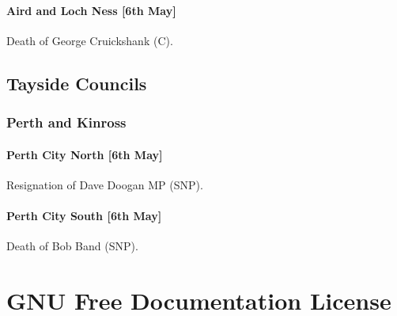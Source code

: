 \documentclass[a4paper,openany]{book}
\begin{document}
\begin{resultsiii}
\subsubsection*{Aird and Loch Ness \hspace*{\fill}\nolinebreak[1]%
	\enspace\hspace*{\fill}
	[6th May]}


Death of George Cruickshank (C).

\section{Tayside Councils}

\subsection*{Perth and Kinross}

\subsubsection*{Perth City North \hspace*{\fill}\nolinebreak[1]%
	\enspace\hspace*{\fill}
	[6th May]}


Resignation of Dave Doogan MP (SNP).

\subsubsection*{Perth City South \hspace*{\fill}\nolinebreak[1]%
	\enspace\hspace*{\fill}
	[6th May]}


Death of Bob Band (SNP).

\end{resultsiii}

\clearpage
{}
{\scriptsize%
\frenchspacing\printindex}
\thispagestyle{plain}

\chapter*{{GNU Free Documentation License}}
\pagestyle{plain}
\end{document}
